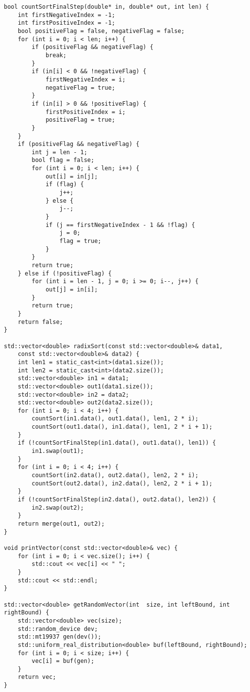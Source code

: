 \documentclass{article}
\begin{document}
\begin{verbatim}
bool countSortFinalStep(double* in, double* out, int len) {
    int firstNegativeIndex = -1;
    int firstPositiveIndex = -1;
    bool positiveFlag = false, negativeFlag = false;
    for (int i = 0; i < len; i++) {
        if (positiveFlag && negativeFlag) {
            break;
        }
        if (in[i] < 0 && !negativeFlag) {
            firstNegativeIndex = i;
            negativeFlag = true;
        }
        if (in[i] > 0 && !positiveFlag) {
            firstPositiveIndex = i;
            positiveFlag = true;
        }
    }
    if (positiveFlag && negativeFlag) {
        int j = len - 1;
        bool flag = false;
        for (int i = 0; i < len; i++) {
            out[i] = in[j];
            if (flag) {
                j++;
            } else {
                j--;
            }
            if (j == firstNegativeIndex - 1 && !flag) {
                j = 0;
                flag = true;
            }
        }
        return true;
    } else if (!positiveFlag) {
        for (int i = len - 1, j = 0; i >= 0; i--, j++) {
            out[j] = in[i];
        }
        return true;
    }
    return false;
}

std::vector<double> radixSort(const std::vector<double>& data1,
    const std::vector<double>& data2) {
    int len1 = static_cast<int>(data1.size());
    int len2 = static_cast<int>(data2.size());
    std::vector<double> in1 = data1;
    std::vector<double> out1(data1.size());
    std::vector<double> in2 = data2;
    std::vector<double> out2(data2.size());
    for (int i = 0; i < 4; i++) {
        countSort(in1.data(), out1.data(), len1, 2 * i);
        countSort(out1.data(), in1.data(), len1, 2 * i + 1);
    }
    if (!countSortFinalStep(in1.data(), out1.data(), len1)) {
        in1.swap(out1);
    }
    for (int i = 0; i < 4; i++) {
        countSort(in2.data(), out2.data(), len2, 2 * i);
        countSort(out2.data(), in2.data(), len2, 2 * i + 1);
    }
    if (!countSortFinalStep(in2.data(), out2.data(), len2)) {
        in2.swap(out2);
    }
    return merge(out1, out2);
}

void printVector(const std::vector<double>& vec) {
    for (int i = 0; i < vec.size(); i++) {
        std::cout << vec[i] << " ";
    }
    std::cout << std::endl;
}

std::vector<double> getRandomVector(int  size, int leftBound, int rightBound) {
    std::vector<double> vec(size);
    std::random_device dev;
    std::mt19937 gen(dev());
    std::uniform_real_distribution<double> buf(leftBound, rightBound);
    for (int i = 0; i < size; i++) {
        vec[i] = buf(gen);
    }
    return vec;
}


\end{verbatim}
\end{document}

